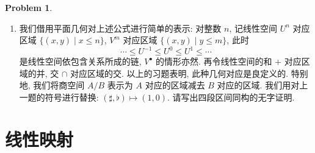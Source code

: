 \documentclass{MainStyle}
\theoremstyle{definition}
\newtheorem{problem}{Problem}
\begin{document}
\begin{problem}
\begin{enumerate}
\begin{equation}
\begin{matrix}
                   & \updownarrow                                                                                    &                                     & \updownarrow                                                                                        & \\[4pt]
                   & \dfrac{(V^{\sharp } \cap U^{\sharp } )+V^{\flat }}{(V^{\sharp } \cap U^{\flat } )+V^{\flat }}   & \xleftrightarrow{\text{子空间对应}} & \dfrac{(U^{\sharp } \cap V^{\flat } )+(U^{\flat } \cap V^{\sharp } )}{U^{\flat } +V^{\flat }}       &
              \end{matrix}.
          \end{equation}
    \item 我们借用平面几何对上述公式进行简单的表示: 对整数 $n$, 记线性空间 $U^n$ 对应区域 $\{(x,y)\mid x\leq n\}$, $V^m$ 对应区域 $\{(x,y)\mid y\leq m\}$, 此时
          \begin{equation}
              \cdots \leq U^{-1}\leq U^0\leq U^1\leq \cdots
          \end{equation}
          是线性空间依包含关系所成的链, $V^\bullet$ 的情形亦然. 再令线性空间的和 $+$ 对应区域的并, 交 $\cap$ 对应区域的交. 以上的习题表明, 此种几何对应是良定义的. 特别地, 我们将商空间 $A/B$ 表示为 $A$ 对应的区域减去 $B$ 对应的区域. 我们用对上一题的符号进行替换: $(\sharp,\flat)\mapsto (1,0)$. 请写出四段区间同构的无字证明.
\end{enumerate}
\end{problem}

\newpage

\section{线性映射}
\end{document}

